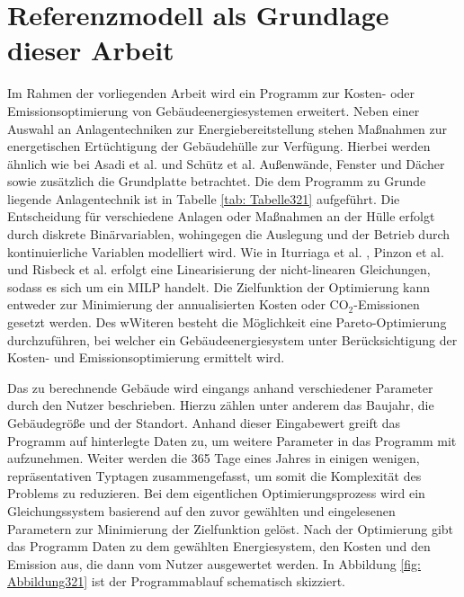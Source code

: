\section{Referenzmodell als Grundlage dieser Arbeit}
\label{sec:Sektion 32}

Im Rahmen der vorliegenden Arbeit wird ein Programm zur Kosten- oder Emissionsoptimierung von Gebäudeenergiesystemen erweitert.
Neben einer Auswahl an Anlagentechniken zur Energiebereitstellung stehen Maßnahmen zur energetischen Ertüchtigung der Gebäudehülle zur Verfügung. 
Hierbei werden ähnlich wie bei Asadi et al. \cite{Asadi.2012} und Schütz et al. \cite{Schutz.2017} Außenwände, Fenster und Dächer sowie zusätzlich die Grundplatte betrachtet.
Die dem Programm zu Grunde liegende Anlagentechnik ist in Tabelle \ref{tab: Tabelle321} aufgeführt.
Die Entscheidung für verschiedene Anlagen oder Maßnahmen an der Hülle erfolgt durch diskrete Binärvariablen, wohingegen die Auslegung und der Betrieb durch kontinuierliche Variablen modelliert wird.
Wie in Iturriaga et al. \cite{Iturriaga.2017}, Pinzon et al. \cite{Pinzon.23.04.201726.04.2017} und Risbeck et al. \cite{Risbeck.2017} erfolgt eine Linearisierung der nicht-linearen Gleichungen, sodass es sich um ein MILP handelt.
Die Zielfunktion der Optimierung kann entweder zur Minimierung der annualisierten Kosten oder CO\(_2\)-Emissionen gesetzt werden.
Des wWiteren besteht die Möglichkeit eine Pareto-Optimierung durchzuführen, bei welcher ein Gebäudeenergiesystem unter Berücksichtigung der Kosten- und Emissionsoptimierung ermittelt wird.

Das zu berechnende Gebäude wird eingangs anhand verschiedener Parameter durch den Nutzer beschrieben.
Hierzu zählen unter anderem das Baujahr, die Gebäudegröße und der Standort.
Anhand dieser Eingabewert greift das Programm auf hinterlegte Daten zu, um weitere Parameter in das Programm mit aufzunehmen.
Weiter werden die 365 Tage eines Jahres in einigen wenigen, repräsentativen Typtagen zusammengefasst, um somit die Komplexität des Problems zu reduzieren.
Bei dem eigentlichen Optimierungsprozess wird ein Gleichungssystem basierend auf den zuvor gewählten und eingelesenen Parametern zur Minimierung der Zielfunktion gelöst.
Nach der Optimierung gibt das Programm Daten zu dem gewählten Energiesystem, den Kosten und den Emission aus, die dann vom Nutzer ausgewertet werden.
In Abbildung \ref{fig: Abbildung321} ist der Programmablauf schematisch skizziert.

